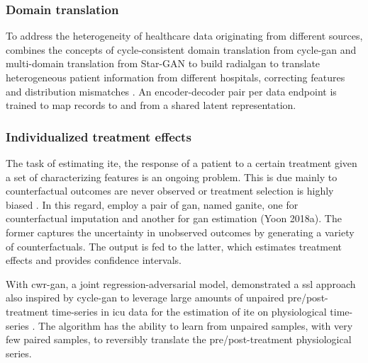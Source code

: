     \subsubsection{Domain translation}
    
        To address the heterogeneity of healthcare data originating from different sources, \citeauthor{Yoon2018-radial} combines the concepts of cycle-consistent domain translation  from \gls{cycle-gan} \cite{Zhu_2017} and multi-domain translation  from Star-GAN \cite{choi2017stargan} to build \gls{radialgan} to translate heterogeneous patient information from different hospitals, correcting features and distribution mismatches \cite{Yoon2018-radial}. An encoder-decoder pair per data endpoint is trained to map records to and from a shared latent representation. 
    
    \subsubsection{Individualized treatment effects}
    
        The task of estimating \gls{ite}, the response of a patient to a certain treatment given a set of characterizing features is an ongoing problem. This is due mainly to counterfactual outcomes are never observed or treatment selection is highly biased \cite{Yoon2018-ite, mcdermott2018semi, walsh2020generating}. In this regard, \citeauthor{Yoon2018-ite} employ a pair of \gls{gan}, named \gls{ganite}, one for counterfactual imputation and another for \gls{gan} estimation (Yoon 2018a). The former captures the uncertainty in unobserved outcomes by generating a variety of counterfactuals. The output is fed to the latter, which estimates treatment effects and provides confidence intervals.\par
    
        With \gls{cwr-gan}, a joint regression-adversarial model, \citeauthor{mcdermott2018semi} demonstrated a \gls{ssl} approach also inspired by \gls{cycle-gan} to leverage large amounts of unpaired pre/post-treatment time-series in \gls{icu} data for the estimation of \gls{ite} on physiological time-series \cite{mcdermott2018semi}. The algorithm has the ability to learn from unpaired samples, with very few paired samples, to reversibly translate the pre/post-treatment physiological series.\par 
    
